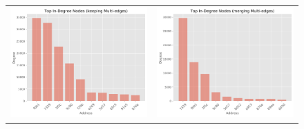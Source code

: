\documentclass[sigconf]{acmart}
\begin{document}


\begin{figure}
\begin{tabular}{cc}%
\includegraphics[scale=0.4]{Top_In-Degree_Nodes_(keeping_Multi-edges).png}&
\includegraphics[scale=0.4]{Top_In-Degree_Nodes_(merging_Multi-edges).png}\\

\end{tabular}
\end{figure}
\end{document}
